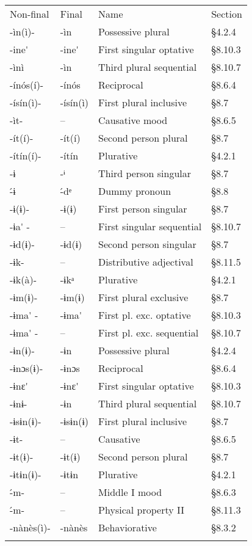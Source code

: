 \begin{tabularx}{\textwidth}{XXXX}
\lsptoprule

Non-final & Final & Name & Section\\
{}-ìn(ì)- & {}-ìn & Possessive plural & §4.2.4\\
{}-ine\'{}  & {}-ine\'{}  & First singular optative & §8.10.3\\
{}-ìnì & {}-ìn & Third plural sequential & §8.10.7\\
{}-ínós(í)- & {}-ínós & Reciprocal & §8.6.4\\
{}-ísín(ì)- & {}-ísín(ì) & First plural inclusive & §8.7\\
{}-ìt- & – & Causative mood & §8.6.5\\
{}-ít(í)- & {}-ít(í) & Second person plural & §8.7\\
{}-ítín(í)- & {}-ítín & Plurative & §4.2.1\\
{}-ɨ & {}-ᶤ & Third person singular & §8.7\\
{}\'{-}ɨ & {}\'{-}dᵉ & Dummy pronoun & §8.8\\
{}-ɨ(ɨ)- & {}-ɨ(ɨ) & First person singular & §8.7\\
{}-ɨa\'{} - & – & First singular sequential & §8.10.7\\
{}-ɨd(ɨ)- & {}-ɨd(ɨ) & Second person singular & §8.7\\
{}-ɨk- & – & Distributive adjectival & §8.11.5\\
{}-ɨk(à)- & {}-ɨkᵃ & Plurative & §4.2.1\\
{}-ɨm(ɨ)- & {}-ɨm(ɨ) & First plural exclusive & §8.7\\
{}-ɨma\'{} - & {}-ɨma\'{}  & First pl. exc. optative & §8.10.3\\
{}-ɨma\'{} - & – & First pl. exc. sequential & §8.10.7\\
{}-ɨn(ɨ)- & {}-ɨn & Possessive plural & §4.2.4\\
{}-ɨnɔs(ɨ)- & {}-ɨnɔs & Reciprocal & §8.6.4\\
{}-ɨnɛ\'{}  & {}-ɨnɛ\'{}  & First singular optative & §8.10.3\\
{}-ɨnɨ- & {}-ɨn & Third plural sequential & §8.10.7\\
{}-ɨsɨn(ɨ)- & {}-ɨsɨn(ɨ) & First plural inclusive & §8.7\\
{}-ɨt- & – & Causative & §8.6.5\\
{}-ɨt(ɨ)- & {}-ɨt(ɨ) & Second person plural & §8.7\\
{}-ɨtɨn(ɨ)- & {}-ɨtɨn & Plurative & §4.2.1\\
{}\'{-}m- & – & Middle I mood & §8.6.3\\
{}\'{-}m- & – & Physical property II & §8.11.3\\
{}-nànès(ì)- & {}-nànès & Behaviorative & §8.3.2\\
\lspbottomrule
\end{tabularx}

